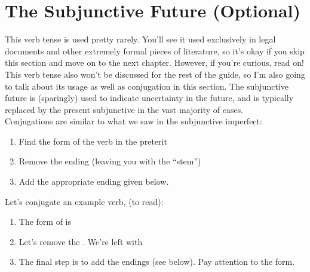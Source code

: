 \section{The Subjunctive Future (Optional)}

This verb tense is used pretty rarely. You'll see it used exclusively in legal documents and other extremely formal pieces of literature, so it's okay if you skip this section and move on to the next chapter. However, if you're curious, read on! \\

This verb tense also won't be discussed for the rest of the guide, so I'm also going to talk about its usage as well as conjugation in this section. The subjunctive future is (sparingly) used to indicate uncertainty in the future, and is typically replaced by the present subjunctive in the vast majority of cases. \\

Conjugations are similar to what we saw in the subjunctive imperfect: 
\begin{enumerate}[noitemsep]
	\item Find the  form of the verb in the preterit
	\item Remove the  ending (leaving you with the ``stem'')
	\item Add the appropriate ending given below. 
\end{enumerate}


Let's conjugate an example verb,  (to read):
\begin{enumerate}[noitemsep]
	\item The  form of  is 
	\item Let's remove the . We're left with 
	\item The final step is to add the endings (see below). Pay attention to the  form. 
\end{enumerate}




